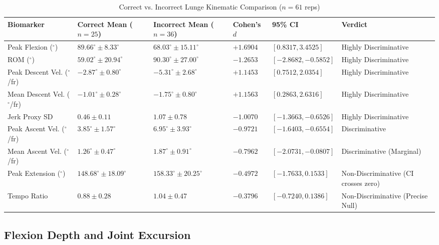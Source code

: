\begin{table}[htbp]
\centering
\scriptsize
\setlength{\tabcolsep}{3pt}
\renewcommand{\arraystretch}{1.2}
\caption{Correct vs. Incorrect Lunge Kinematic Comparison ($n = 61$ reps)}
\label{tab:table-5-1-correct-vs-incorrect-lunge-kinematic-comparison-reps}
\begin{tabular}{@{}p{3.1cm} >{\centering\arraybackslash}p{2.2cm} >{\centering\arraybackslash}p{2.2cm} >{\centering\arraybackslash}p{1.0cm} >{\centering\arraybackslash}p{2.3cm} p{3.4cm}@{}}
\hline
\textbf{Biomarker} & \textbf{Correct Mean} ($n=25$) & \textbf{Incorrect Mean} ($n=36$) & \textbf{Cohen's $d$} & \textbf{95\% CI} & \textbf{Verdict} \\
\hline
Peak Flexion ($^\circ$) & $89.66^\circ \pm 8.33^\circ$ & $68.03^\circ \pm 15.11^\circ$ & $+1.6904$ & $[0.8317, 3.4525]$ & Highly Discriminative \\
ROM ($^\circ$) & $59.02^\circ \pm 20.94^\circ$ & $90.30^\circ \pm 27.00^\circ$ & $-1.2653$ & $[-2.8682, -0.5852]$ & Highly Discriminative \\
Peak Descent Vel. ($^\circ$/fr) & $-2.87^\circ \pm 0.80^\circ$ & $-5.31^\circ \pm 2.68^\circ$ & $+1.1453$ & $[0.7512, 2.0354]$ & Highly Discriminative \\
Mean Descent Vel. ($^\circ$/fr) & $-1.01^\circ \pm 0.28^\circ$ & $-1.75^\circ \pm 0.80^\circ$ & $+1.1563$ & $[0.2863, 2.6316]$ & Highly Discriminative \\
Jerk Proxy SD & $0.46 \pm 0.11$ & $1.07 \pm 0.78$ & $-1.0070$ & $[-1.3663, -0.6526]$ & Highly Discriminative \\
Peak Ascent Vel. ($^\circ$/fr) & $3.85^\circ \pm 1.57^\circ$ & $6.95^\circ \pm 3.93^\circ$ & $-0.9721$ & $[-1.6403, -0.6554]$ & Discriminative \\
Mean Ascent Vel. ($^\circ$/fr) & $1.26^\circ \pm 0.47^\circ$ & $1.87^\circ \pm 0.91^\circ$ & $-0.7962$ & $[-2.0731, -0.0807]$ & Discriminative (Marginal) \\
Peak Extension ($^\circ$) & $148.68^\circ \pm 18.09^\circ$ & $158.33^\circ \pm 20.25^\circ$ & $-0.4972$ & $[-1.7633, 0.1533]$ & Non-Discriminative (CI crosses zero) \\
Tempo Ratio & $0.88 \pm 0.28$ & $1.04 \pm 0.47$ & $-0.3796$ & $[-0.7240, 0.1386]$ & Non-Discriminative (Precise Null) \\
\hline
\end{tabular}
\end{table}

\subsection{Flexion Depth and Joint Excursion}
\label{sec:5-2-1-flexion-depth-and-joint-excursion}

